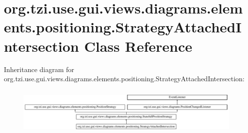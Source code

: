 \hypertarget{classorg_1_1tzi_1_1use_1_1gui_1_1views_1_1diagrams_1_1elements_1_1positioning_1_1_strategy_attached_intersection}{\section{org.\-tzi.\-use.\-gui.\-views.\-diagrams.\-elements.\-positioning.\-Strategy\-Attached\-Intersection Class Reference}
\label{classorg_1_1tzi_1_1use_1_1gui_1_1views_1_1diagrams_1_1elements_1_1positioning_1_1_strategy_attached_intersection}
}
Inheritance diagram for org.\-tzi.\-use.\-gui.\-views.\-diagrams.\-elements.\-positioning.\-Strategy\-Attached\-Intersection\-:\begin{figure}[H]
\begin{center}
\leavevmode
\includegraphics[height=2.362869cm]{classorg_1_1tzi_1_1use_1_1gui_1_1views_1_1diagrams_1_1elements_1_1positioning_1_1_strategy_attached_intersection}
\end{center}
\end{figure}
